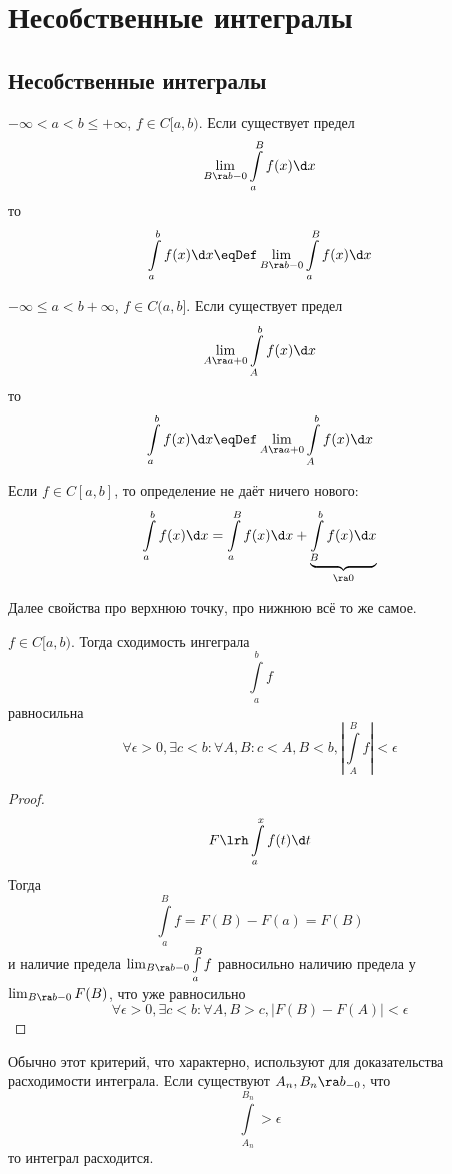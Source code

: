 \chapter{Несобственные интегралы}

\section{Несобственные интегралы}

\begin{Def}
	$-\infty < a < b \le +\infty$, $f \in C[a,b)$.
	Если существует предел
	\[ \lim_{B \ra b-0} \int\limits_a^B f(x) \d x \]
	то
	\[ \int\limits_a^b f(x) \d x \eqDef \lim_{B \ra b-0} \int\limits_a^B f(x) \d x \]
\end{Def}

\begin{Def}
	$-\infty \le a < b +\infty$, $f \in C(a,b]$.
	Если существует предел
	\[ \lim_{A \ra a+0} \int\limits_A^b f(x) \d x \]
	то
	\[ \int\limits_a^b f(x) \d x \eqDef \lim_{A \ra a+0} \int\limits_A^b f(x) \d x \]
\end{Def}

\begin{Rem}
	Если $f \in C[a, b]$, то определение не даёт ничего нового:
	\[ \int\limits_a^b f(x) \d x = \int\limits_a^B f(x) \d x + \underbrace{\int\limits_B^b f(x) \d x}_{\ra0} \]
\end{Rem}

Далее свойства про верхнюю точку, про нижнюю всё то же самое.

\begin{theorem}
	$f \in C[a, b)$. Тогда сходимость ингеграла
	\[ \int\limits_a^b f \]
	равносильна
	\[ \forall \epsilon > 0, \exists c < b\colon \forall A, B\colon c < A, B < b, \left|\int\limits_A^B f\right| < \epsilon \]
\end{theorem}
\begin{proof}
	\[ F \lrh \int\limits_a^x f(t) \d t \]
	Тогда
	\[ \int\limits_a^B f = F(B) - F(a) = F(B) \]
	и наличие предела $\lim_{B \ra b-0} \int\limits_a^B f$ равносильно наличию предела у $\lim_{B \ra b-0} F(B)$,
	что уже равносильно
	\[ \forall \epsilon > 0, \exists c < b\colon \forall A, B > c, |F(B) - F(A)| < \epsilon \]
\end{proof}

\begin{Rem}
	Обычно этот критерий, что характерно, используют для доказательства расходимости интеграла.
	Если существуют $A_n, B_n \ra b_{-0}$, что
	\[ \int\limits_{A_n}^{B_n} > \epsilon \]
	то интеграл расходится.
\end{Rem}


